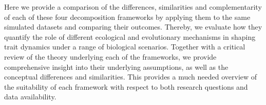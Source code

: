 Here we provide a comparison of the differences, similarities and complementarity of each of these four decomposition frameworks by applying them to the same simulated datasets and comparing their outcomes. Thereby, we evaluate how they quantify the role of different ecological and evolutionary mechanisms in shaping trait dynamics under a range of biological scenarios. Together with a critical review of the theory underlying each of the frameworks, we provide comprehensive insight into their underlying assumptions, as well as the conceptual differences and similarities. This provides a much needed overview of the suitability of each framework with respect to both research questions and data availability.


\printbibliography[heading=subbibliography]
